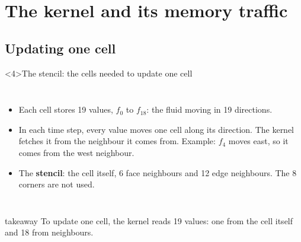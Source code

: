 \documentclass[aspectratio=169,10pt,t]{beamer}
\newcommand{\term}[1]{\textcolor{psblue!85!black}{\textbf{#1}}} %
\newcommand{\takeaway}[1]{\par\vfill
  \begin{beamercolorbox}[wd=\textwidth,sep=4pt,rounded=true]{takeaway}
    \small #1
  \end{beamercolorbox}}
\begin{document}
\section[The kernel]{The kernel and its memory traffic}
\subsection{Updating one cell}

\begin{frame}<4>{The stencil: the cells needed to update one cell}
  \begin{columns}[T,onlytextwidth]
    \vspace{4mm}
    \centering
    \vspace{1mm}
    \begin{itemize}\small
      \item Each cell stores 19 values, $f_0$ to $f_{18}$: the fluid moving in 19 directions.
      \item<2-> In each time step, every value moves one cell along its direction. The kernel fetches it from
            the neighbour it comes from. Example: $f_4$ moves east, so it comes from the west neighbour.
      \item<4-> The \term{stencil}: the cell itself, 6 face neighbours and 12 edge neighbours. The 8 corners
            are not used.
    \end{itemize}
  \end{columns}
  \takeaway{To update one cell, the kernel reads 19 values: one from the cell itself and 18 from neighbours.}
\end{frame}
\end{document}
